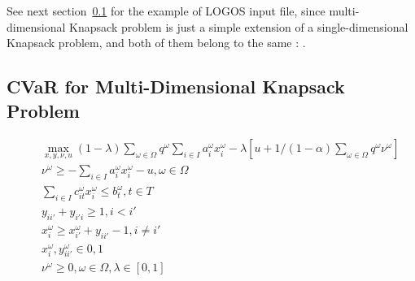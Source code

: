 See next section~\ref{subsec:CVaR_DKP} for the example of LOGOS input file, since multi-dimensional Knapsack problem
is just a simple extension of a single-dimensional Knapsack problem, and both of them belong to the same
: .


\subsection{CVaR for Multi-Dimensional Knapsack Problem}
\label{subsec:CVaR_DKP}

\vst {}
\begin{subequations}\label{CVaRMultiDKP}
\begin{eqnarray}
& & \max_{x, y, \nu, u} (1-\lambda)  \sum _{ \omega  \in  \Omega }^{}q^{ \omega } \sum _{i \in I}^{} a_{i}^{ \omega }x_{i}^{ \omega } - \lambda[u+1/(1-\alpha)\sum_{\omega \in \Omega} q^\omega \nu^\omega] \\
& & \nu^\omega \ge - \sum _{i \in I}^{} a_{i}^{ \omega }x_{i}^{ \omega } - u, \omega \in \Omega \\
& & \sum_{i \in I} c_{it}^\omega x_{i}^\omega \leq b_{t}^\omega, t\in T \\
& & y_{ii'} + y_{i'i} \geq 1, i<i'  \\
& & x_{i}^\omega \geq x_{i'}^\omega + y_{ii'}-1, i\neq i' \\
& & x_{i}^\omega, y_{ii'}^\omega \in {0, 1} \\
& & \nu^\omega \ge 0, \omega \in \Omega, \lambda \in [0, 1]
\end{eqnarray}
\end{subequations}

